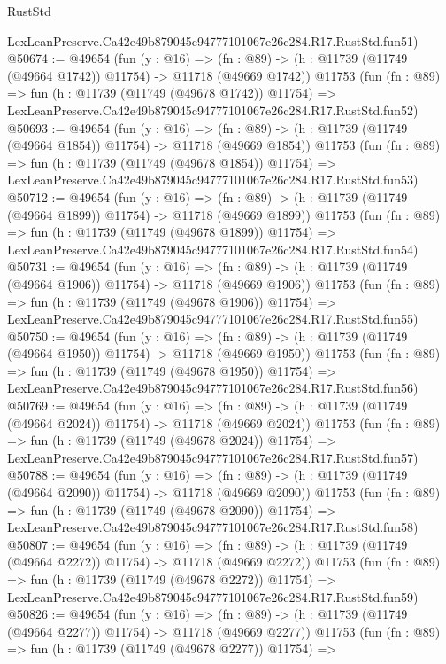 \begin{lexlean}{RustStd}
\begin{coremodule}
    LexLeanPreserve.Ca42e49b879045c94777101067e26c284.R17.RustStd.fun51)
@50674 := @49654
    (fun (y : @16) =>
    (fn : @89) -> (h : @11739 (@11749 (@49664 @1742)) @11754) -> @11718 (@49669 @1742))
    @11753
    (fun (fn : @89) =>
    fun (h : @11739 (@11749 (@49678 @1742)) @11754) =>
    LexLeanPreserve.Ca42e49b879045c94777101067e26c284.R17.RustStd.fun52)
@50693 := @49654
    (fun (y : @16) =>
    (fn : @89) -> (h : @11739 (@11749 (@49664 @1854)) @11754) -> @11718 (@49669 @1854))
    @11753
    (fun (fn : @89) =>
    fun (h : @11739 (@11749 (@49678 @1854)) @11754) =>
    LexLeanPreserve.Ca42e49b879045c94777101067e26c284.R17.RustStd.fun53)
@50712 := @49654
    (fun (y : @16) =>
    (fn : @89) -> (h : @11739 (@11749 (@49664 @1899)) @11754) -> @11718 (@49669 @1899))
    @11753
    (fun (fn : @89) =>
    fun (h : @11739 (@11749 (@49678 @1899)) @11754) =>
    LexLeanPreserve.Ca42e49b879045c94777101067e26c284.R17.RustStd.fun54)
@50731 := @49654
    (fun (y : @16) =>
    (fn : @89) -> (h : @11739 (@11749 (@49664 @1906)) @11754) -> @11718 (@49669 @1906))
    @11753
    (fun (fn : @89) =>
    fun (h : @11739 (@11749 (@49678 @1906)) @11754) =>
    LexLeanPreserve.Ca42e49b879045c94777101067e26c284.R17.RustStd.fun55)
@50750 := @49654
    (fun (y : @16) =>
    (fn : @89) -> (h : @11739 (@11749 (@49664 @1950)) @11754) -> @11718 (@49669 @1950))
    @11753
    (fun (fn : @89) =>
    fun (h : @11739 (@11749 (@49678 @1950)) @11754) =>
    LexLeanPreserve.Ca42e49b879045c94777101067e26c284.R17.RustStd.fun56)
@50769 := @49654
    (fun (y : @16) =>
    (fn : @89) -> (h : @11739 (@11749 (@49664 @2024)) @11754) -> @11718 (@49669 @2024))
    @11753
    (fun (fn : @89) =>
    fun (h : @11739 (@11749 (@49678 @2024)) @11754) =>
    LexLeanPreserve.Ca42e49b879045c94777101067e26c284.R17.RustStd.fun57)
@50788 := @49654
    (fun (y : @16) =>
    (fn : @89) -> (h : @11739 (@11749 (@49664 @2090)) @11754) -> @11718 (@49669 @2090))
    @11753
    (fun (fn : @89) =>
    fun (h : @11739 (@11749 (@49678 @2090)) @11754) =>
    LexLeanPreserve.Ca42e49b879045c94777101067e26c284.R17.RustStd.fun58)
@50807 := @49654
    (fun (y : @16) =>
    (fn : @89) -> (h : @11739 (@11749 (@49664 @2272)) @11754) -> @11718 (@49669 @2272))
    @11753
    (fun (fn : @89) =>
    fun (h : @11739 (@11749 (@49678 @2272)) @11754) =>
    LexLeanPreserve.Ca42e49b879045c94777101067e26c284.R17.RustStd.fun59)
@50826 := @49654
    (fun (y : @16) =>
    (fn : @89) -> (h : @11739 (@11749 (@49664 @2277)) @11754) -> @11718 (@49669 @2277))
    @11753
    (fun (fn : @89) =>
    fun (h : @11739 (@11749 (@49678 @2277)) @11754) =>

\end{coremodule}
\end{lexlean}
